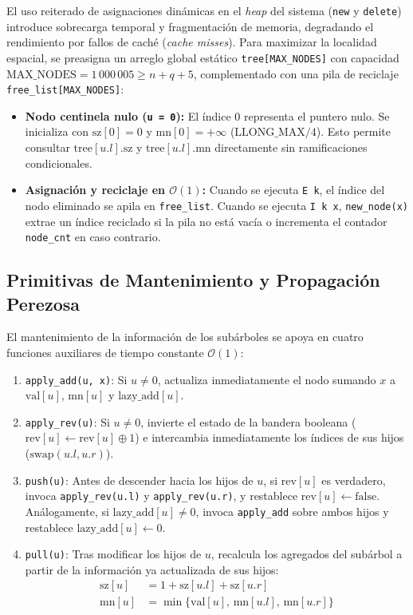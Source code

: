 \documentclass[journal,10pt,a4paper]{IEEEtran}
\begin{document}
El uso reiterado de asignaciones dinámicas en el \textit{heap} del sistema (\texttt{new} y \texttt{delete}) introduce sobrecarga temporal y fragmentación de memoria, degradando el rendimiento por fallos de caché (\textit{cache misses}). Para maximizar la localidad espacial, se preasigna un arreglo global estático \texttt{tree[MAX\_NODES]} con capacidad $\text{MAX\_NODES} = 1\,000\,005 \ge n + q + 5$, complementado con una pila de reciclaje \texttt{free\_list[MAX\_NODES]}:
\begin{itemize}
    \item \textbf{Nodo centinela nulo (\texttt{u = 0}):} El índice $0$ representa el puntero nulo. Se inicializa con $\text{sz}[0] = 0$ y $\text{mn}[0] = +\infty$ ($\text{LLONG\_MAX} / 4$). Esto permite consultar $\text{tree}[u.l].\text{sz}$ y $\text{tree}[u.l].\text{mn}$ directamente sin ramificaciones condicionales.
    \item \textbf{Asignación y reciclaje en $\mathcal{O}(1)$:} Cuando se ejecuta \texttt{E k}, el índice del nodo eliminado se apila en \texttt{free\_list}. Cuando se ejecuta \texttt{I k x}, \texttt{new\_node(x)} extrae un índice reciclado si la pila no está vacía o incrementa el contador \texttt{node\_cnt} en caso contrario.
\end{itemize}

\subsection{Primitivas de Mantenimiento y Propagación Perezosa}

El mantenimiento de la información de los subárboles se apoya en cuatro funciones auxiliares de tiempo constante $\mathcal{O}(1)$:
\begin{enumerate}
    \item \texttt{apply\_add(u, x)}: Si $u \neq 0$, actualiza inmediatamente el nodo sumando $x$ a $\text{val}[u]$, $\text{mn}[u]$ y $\text{lazy\_add}[u]$.
    \item \texttt{apply\_rev(u)}: Si $u \neq 0$, invierte el estado de la bandera booleana ($\text{rev}[u] \leftarrow \text{rev}[u] \oplus 1$) e intercambia inmediatamente los índices de sus hijos ($\text{swap}(u.l, u.r)$).
    \item \texttt{push(u)}: Antes de descender hacia los hijos de $u$, si $\text{rev}[u]$ es verdadero, invoca \texttt{apply\_rev(u.l)} y \texttt{apply\_rev(u.r)}, y restablece $\text{rev}[u] \leftarrow \text{false}$. Análogamente, si $\text{lazy\_add}[u] \neq 0$, invoca \texttt{apply\_add} sobre ambos hijos y restablece $\text{lazy\_add}[u] \leftarrow 0$.
    \item \texttt{pull(u)}: Tras modificar los hijos de $u$, recalcula los agregados del subárbol a partir de la información ya actualizada de sus hijos:
    \begin{align}
        \text{sz}[u] &= 1 + \text{sz}[u.l] + \text{sz}[u.r] \\
        \text{mn}[u] &= \min\{\text{val}[u],\, \text{mn}[u.l],\, \text{mn}[u.r]\}
    \end{align}
\end{enumerate}
\end{document}
